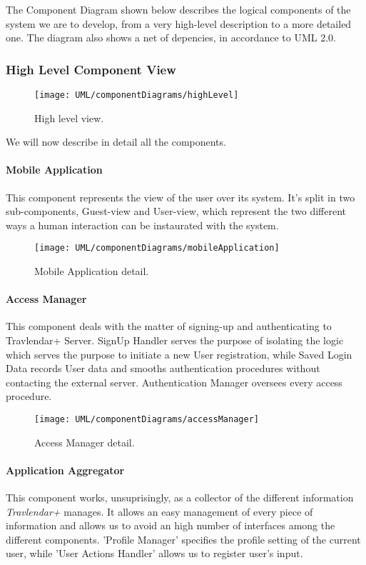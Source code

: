 The Component Diagram shown below describes the logical components of the system we are to develop, from a very high-level description to a more detailed one. The diagram also shows a net of depencies, in accordance to UML 2.0.

\subsubsection{High Level Component View}

	\begin{figure}[H]
			\centering
			\texttt{[image: UML/componentDiagrams/highLevel]}
			\caption{High level view.}
			\label{componentHighLevel}
		\end{figure}

	We will now describe in detail all the components.

	\paragraph{Mobile Application}
		This component represents the view of the user over its system. It’s split in two sub-components, Guest-view and User-view, which represent the two different ways a human interaction can be instaurated with the system.

		\begin{figure}[H]
			\centering
			\texttt{[image: UML/componentDiagrams/mobileApplication]}
			\caption{Mobile Application detail.}
			\label{mobileApplicationDetail}
		\end{figure}

	\paragraph{Access Manager}
	This component deals with the matter of signing-up and authenticating to Travlendar+ Server. SignUp Handler serves the purpose of isolating the logic which serves the purpose to initiate a new User registration, while Saved Login Data records User data and smooths authentication procedures without contacting the external server. Authentication Manager oversees every access procedure.
		\begin{figure}[H]
			\centering
			\texttt{[image: UML/componentDiagrams/accessManager]}
			\caption{Access Manager detail.}
			\label{accessManagerDetail}
		\end{figure}
		
		
	\paragraph{Application Aggregator}
		This component works, unsuprisingly, as a collector of the different information \textit{Travlendar+} manages. It allows an easy management of every piece of information and allows us to avoid an high number of interfaces among the different components. 'Profile Manager' specifies the profile setting of the current user, while 'User Actions Handler' allows us to register user's input.
	
